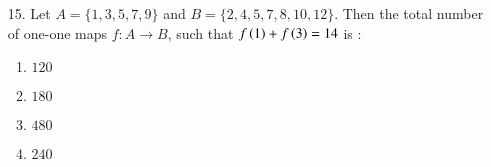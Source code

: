 \documentclass[journal,12pt,onecolumn]{IEEEtran}
\theoremstyle{remark}
\begin{document}
\begin{enumerate}
\begin{multicols}{4}
\begin{enumerate}
            \item $64$ \columnbreak
            \item $81$ \columnbreak
            \item $108$ \columnbreak
            \item $32$
		\end{enumerate}
	\end{multicols}
\item[15.] Let $A = \{ 1, 3, 5, 7, 9\}$ and $B = \{ 2, 4, 5, 7, 8, 10, 12 \}$. Then the total
    number of one-one maps $f : A \rightarrow B$, such that $f\left(1\right) + f\left(3\right) = 14$ is :
		\hfill{}
	\begin{multicols}{4}
		\begin{enumerate}
			\item $120$ \columnbreak
			\item $180$ \columnbreak
			\item $480$ \columnbreak
			\item $240$
		\end{enumerate}
	\end{multicols}
	\end{enumerate}
\end{document}
